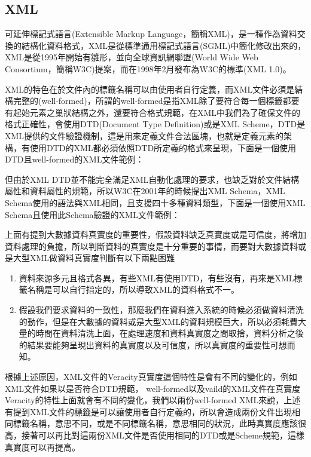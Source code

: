 \subsection{XML}
可延伸標記式語言(Extensible Markup Language，簡稱XML)，是一種作為資料交換的結構化資料格式，XML是從標準通用標記式語言(SGML)中簡化修改出來的，XML是從1995年開始有雛形，並向全球資訊網聯盟(World Wide Web Consortium，簡稱W3C)提案，而在1998年2月發布為W3C的標準(XML 1.0)。\\\par
XML的特色在於文件內的標籤名稱可以由使用者自行定義，而XML文件必須是結構完整的(well-formed)，所謂的well-formed是指XML除了要符合每一個標籤都要有起始元素之巢狀結構之外，還要符合格式規範，在XML中我們為了確保文件的格式正確性，會使用DTD(Document Type Definition)或是XML Scheme，DTD是XML提供的文件驗證機制，這是用來定義文件合法區塊，也就是定義元素的架構，有使用DTD的XML都必須依照DTD所定義的格式來呈現，下面是一個使用DTD且well-formed的XML文件範例：

但由於XML DTD並不能完全滿足XML自動化處理的要求，也缺乏對於文件結構屬性和資料屬性的規範，所以W3C在2001年的時候提出XML Schema，XML Schema使用的語法與XML相同，且支援四十多種資料類型，下面是一個使用XML Schema且使用此Schema驗證的XML文件範例：
\newpage


\par
上面有提到大數據資料真實度的重要性，假設資料缺乏真實度或是可信度，將增加資料處理的負擔，所以判斷資料的真實度是十分重要的事情，而要對大數據資料或是大型XML做資料真實度判斷有以下兩點困難
\begin{enumerate}
\item 資料來源多元且格式各異，有些XML有使用DTD，有些沒有，再來是XML標籤名稱是可以自行指定的，所以導致XML的資料格式不一。
\item 假設我們要求資料的一致性，那麼我們在資料進入系統的時候必須做資料清洗的動作，但是在大數據的資料或是大型XML的資料規模巨大，所以必須耗費大量的時間在資料清洗上面，在處理速度和資料真實度之間取捨，資料分析之後的結果要能夠呈現出資料的真實度以及可信度，所以真實度的重要性可想而知。
\end{enumerate}
\par
根據上述原因，XML文件的Veracity真實度這個特性是會有不同的變化的，例如XML文件如果以是否符合DTD規範， well-formed以及vaild的XML文件在真實度Veracity的特性上面就會有不同的變化，我們以兩份well-formed XML來說，上述有提到XML文件的標籤是可以讓使用者自行定義的，所以會造成兩份文件出現相同標籤名稱，意思不同，或是不同標籤名稱，意思相同的狀況，此時真實度應該很高，接著可以再比對這兩份XML文件是否使用相同的DTD或是Scheme規範，這樣真實度可以再提高。
